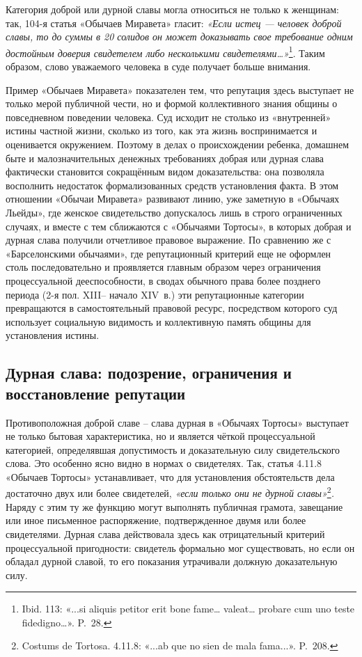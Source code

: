 Категория доброй или дурной славы могла относиться не только к женщинам: так, 104-я статья «Обычаев Миравета» гласит: \emph{«Если истец --- человек доброй славы, то до суммы в 20 солидов он может доказывать свое требование одним достойным доверия свидетелем либо несколькими свидетелями…»}\footnote{Ibid. 113: «...si aliquis petitor erit bone fame… valeat… probare cum uno teste fidedigno…». P.~28.}. Таким образом, слово уважаемого человека в суде получает больше внимания.

Пример «Обычаев Миравета» показателен тем, что репутация здесь выступает не только мерой публичной чести, но и формой коллективного знания общины о повседневном поведении человека. Суд исходит не столько из «внутренней» истины частной жизни, сколько из того, как эта жизнь воспринимается и оценивается окружением. Поэтому в делах о происхождении ребенка, домашнем быте и малозначительных денежных требованиях добрая или дурная слава фактически становится сокращённым видом доказательства: она позволяла восполнить недостаток формализованных средств установления факта. В этом отношении «Обычаи Миравета» развивают линию, уже заметную в «Обычаях Льейды», где женское свидетельство допускалось лишь в строго ограниченных случаях, и вместе с тем сближаются с «Обычаями Тортосы», в которых добрая и дурная слава\emph{ }получили отчетливое правовое выражение. По сравнению же с «Барселонскими обычаями», где репутационный критерий еще не оформлен столь последовательно и проявляется главным образом через ограничения процессуальной дееспособности, в сводах обычного права более позднего периода (2-я пол. XIII-- начало XIV~в.) эти репутационные категории превращаются в самостоятельный правовой ресурс, посредством которого суд использует социальную видимость и коллективную память общины для установления истины.

\subsection{Дурная слава: подозрение, ограничения и восстановление репутации}

Противоположная доброй славе -- слава дурная в «Обычаях Тортосы» выступает не только бытовая характеристика, но и является чёткой процессуальной категорией, определявшая допустимость и доказательную силу свидетельского слова. Это особенно ясно видно в нормах о свидетелях. Так, статья 4.11.8 «Обычаев Тортосы» устанавливает, что для установления обстоятельств дела достаточно двух или более свидетелей,\emph{ «если только они не дурной славы»}\footnote{Costums de Tortosa. 4.11.8: «...ab que no sien de mala fama...». P.~208.}\emph{. }Наряду с этим ту же функцию могут выполнять публичная грамота, завещание или иное письменное распоряжение, подтвержденное двумя или более свидетелями. Дурная слава действовала здесь как отрицательный критерий процессуальной пригодности: свидетель формально мог существовать, но если он обладал дурной славой, то его показания утрачивали должную доказательную силу.

